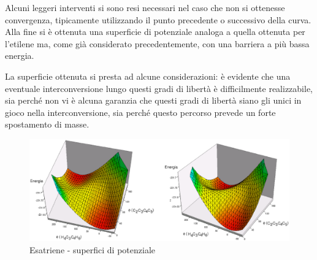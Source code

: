Alcuni leggeri interventi si sono resi necessari nel caso che non si
ottenesse convergenza, tipicamente utilizzando il punto precedente o
successivo della curva. Alla fine si \`e ottenuta una superficie di
potenziale analoga a quella ottenuta per l'etilene ma, come gi\`a considerato
precedentemente, con una barriera a pi\`u bassa energia. 

\clearpage
\pagebreak

La superficie ottenuta si presta ad alcune considerazioni: \`e evidente che una
eventuale interconversione lungo questi gradi di libert\`a \`e difficilmente
realizzabile, sia perch\'e non vi \`e alcuna garanzia che questi gradi di
libert\`a siano gli unici in gioco nella interconversione, sia perch\'e questo
percorso prevede un forte spostamento di masse.

\begin{figure}[ht]
\begin{center}
\includegraphics[angle=0,width=12cm,keepaspectratio]{immagini/esatriene/3d.eps}
\caption{\small Esatriene - superfici di potenziale}
\label{fig:esatriene_3d}
\end{center}
\end{figure}

